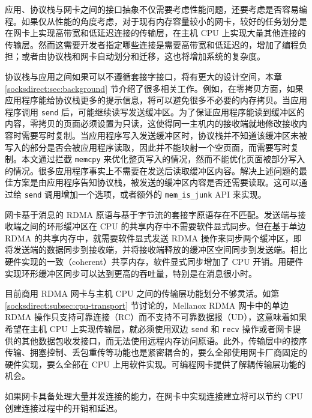 应用、协议栈与网卡之间的接口抽象不仅需要考虑性能问题，还要考虑是否容易编程。如果仅从性能的角度考虑，对于现有内存容量较小的网卡，较好的任务划分是在网卡上实现高带宽和低延迟连接的传输层，在主机 CPU 上实现大量其他连接的传输层。然而这需要开发者指定哪些连接是需要高带宽和低延迟的，增加了编程负担；或者由协议栈和网卡自动划分和迁移，这也将增加系统的复杂度。

协议栈与应用之间如果可以不遵循套接字接口，将有更大的设计空间，本章 \ref{socksdirect:sec:background} 节介绍了很多相关工作。例如，在零拷贝方面，如果应用程序能给协议栈更多的提示信息，将可以避免很多不必要的内存拷贝。当应用程序调用 \texttt{send} 后，可能继续读写发送缓冲区。为了保证应用程序能读到缓冲区的内容，零拷贝的页面必须设置为只读，这使得同一主机内的接收端就地修改接收内容时需要写时复制。当应用程序写入发送缓冲区时，协议栈并不知道该缓冲区未被写入的部分是否会被应用程序读取，因此并不能映射一个空页面，而需要写时复制。本文通过拦截 \texttt{memcpy} 来优化整页写入的情况，然而不能优化页面被部分写入的情况。很多应用程序事实上不需要在发送后读取缓冲区内容。解决上述问题的最佳方案是由应用程序告知协议栈，被发送的缓冲区内容是否还需要读取。这可以通过给 \texttt{send} 调用增加一个选项，或者额外的 \texttt{mem\_is\_junk} API 来实现。

网卡基于消息的 RDMA 原语与基于字节流的套接字原语存在不匹配。发送端与接收端之间的环形缓冲区在 CPU 的共享内存中不需要软件显式同步。但在基于单边 RDMA 的共享内存中，就需要软件显式发送 RDMA 操作来同步两个缓冲区，即将发送端的数据同步到接收端，并将接收端释放的缓冲区空间同步到发送端。相比硬件实现的一致（coherent）共享内存，软件显式同步增加了 CPU 开销。用硬件实现环形缓冲区同步可以达到更高的吞吐量，特别是在消息很小时。

目前商用 RDMA 网卡与主机 CPU 之间的传输层功能划分不够灵活。如第 \ref{socksdirect:subsec:cpu-transport} 节讨论的，Mellanox RDMA 网卡中的单边 RDMA 操作只支持可靠连接（RC）而不支持不可靠数据报（UD），这意味着如果希望在主机 CPU 上实现传输层，就必须使用双边 \texttt{send} 和 \texttt{recv} 操作或者网卡提供的其他数据包收发接口，而无法使用远程内存访问原语。此外，传输层中的按序传输、拥塞控制、丢包重传等功能也是紧密耦合的，要么全部使用网卡厂商固定的硬件实现，要么全部在 CPU 上用软件实现。可编程网卡提供了解耦传输层功能的机会。

如果网卡具备处理大量并发连接的能力，在网卡中实现连接建立将可以节约 CPU 创建连接过程中的开销和延迟。


